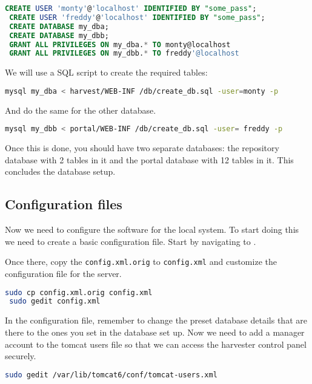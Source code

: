 \documentclass[a4paper,11pt]{article}
\begin{document}
\begin{lstlisting}[language=SQL]
 CREATE USER 'monty'@'localhost' IDENTIFIED BY "some_pass"; 
 CREATE USER 'freddy'@'localhost' IDENTIFIED BY "some_pass"; 
 CREATE DATABASE my_dba; 
 CREATE DATABASE my_dbb; 
 GRANT ALL PRIVILEGES ON my_dba.* TO monty@localhost 
 GRANT ALL PRIVILEGES ON my_dbb.* TO freddy'@localhost
\end{lstlisting}

We will use a SQL script to create the required tables: 

\begin{lstlisting}[language=bash]
 mysql my_dba < harvest/WEB-INF /db/create_db.sql -user=monty -p
\end{lstlisting}

And do the same for the other database. 

\begin{lstlisting}[language=bash]
 mysql my_dbb < portal/WEB-INF /db/create_db.sql -user= freddy -p
\end{lstlisting}

Once this is done, you should have two separate databases: the repository database with 2 tables in it and the portal database with 12 tables in it. This concludes the database setup.

\subsection{Configuration files}

Now we need to configure the software for the local system. To start doing this we need to create a basic configuration file. Start by navigating to .

Once there, copy the \texttt{config.xml.orig} to \texttt{config.xml} and customize the configuration file for the server. 

\begin{lstlisting}[language=bash]
 sudo cp config.xml.orig config.xml 
 sudo gedit config.xml
\end{lstlisting}

In the configuration file, remember to change the preset database details that are there to the ones you set in the database set up. Now we need to add a manager account to the tomcat users file so that we can access the harvester control panel securely. 

\begin{lstlisting}[language=bash]
 sudo gedit /var/lib/tomcat6/conf/tomcat-users.xml
\end{lstlisting}
\end{document}
